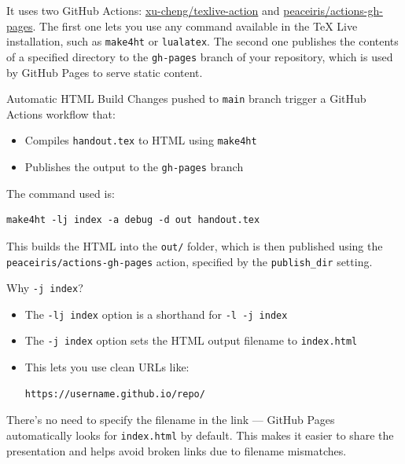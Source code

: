 It uses two GitHub Actions: \href{https://github.com/xu-cheng/texlive-action}{xu-cheng/texlive-action}
and \href{https://github.com/peaceiris/actions-gh-pages}{peaceiris/actions-gh-pages}.
The first one lets you use any command available in the TeX Live installation, such as \texttt{make4ht} or \texttt{lualatex}.
The second one publishes the contents of a specified directory to the \texttt{gh-pages} branch of your repository,
which is used by GitHub Pages to serve static content.



\begin{frame}[fragile]{Automatic HTML Build}
Changes pushed to \texttt{main} branch trigger a GitHub Actions workflow that:

\begin{itemize}
  \item Compiles \texttt{handout.tex} to HTML using \texttt{make4ht}
  \item Publishes the output to the \texttt{gh-pages} branch
\end{itemize}

The command used is:

\begin{verbatim}
make4ht -lj index -a debug -d out handout.tex
\end{verbatim}
\end{frame}


This builds the HTML into the \texttt{out/} folder, which is then published
using the \texttt{peaceiris/actions-gh-pages} action, specified by the
\texttt{publish\_dir} setting.


\begin{frame}[fragile]{Why \texttt{-j index}?}
\begin{itemize}
  \item The \texttt{-lj index} option is a shorthand for \texttt{-l -j index}
  \item The \texttt{-j index} option sets the HTML output filename to \texttt{index.html}
  \item This lets you use clean URLs like:
  
\begin{verbatim}
https://username.github.io/repo/
\end{verbatim}

\end{itemize}
\end{frame}


There’s no need to specify the filename in the link — GitHub Pages
automatically looks for \texttt{index.html} by default. This makes it easier to share
the presentation and helps avoid broken links due to filename mismatches.

